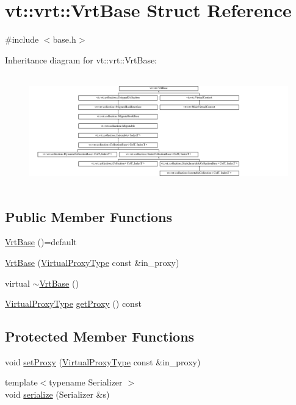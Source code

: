 \hypertarget{structvt_1_1vrt_1_1_vrt_base}{}\section{vt\+:\+:vrt\+:\+:Vrt\+Base Struct Reference}
\label{structvt_1_1vrt_1_1_vrt_base}


{\ttfamily \#include $<$base.\+h$>$}

Inheritance diagram for vt\+:\+:vrt\+:\+:Vrt\+Base\+:\begin{figure}[H]
\begin{center}
\leavevmode
\includegraphics[height=4.873803cm]{structvt_1_1vrt_1_1_vrt_base}
\end{center}
\end{figure}
\subsection*{Public Member Functions}
\begin{DoxyCompactItemize}
\item 
\hyperlink{structvt_1_1vrt_1_1_vrt_base_a5f98da4f22c55e58f5759eb84ac7cd06}{Vrt\+Base} ()=default
\item 
\hyperlink{structvt_1_1vrt_1_1_vrt_base_a7cc2b4f4ad3f2807e73b3d7a0a5b3676}{Vrt\+Base} (\hyperlink{namespacevt_a1b417dd5d684f045bb58a0ede70045ac}{Virtual\+Proxy\+Type} const \&in\+\_\+proxy)
\item 
virtual \hyperlink{structvt_1_1vrt_1_1_vrt_base_a16d15fcaabbf2e477315466dcaaa6f84}{$\sim$\+Vrt\+Base} ()
\item 
\hyperlink{namespacevt_a1b417dd5d684f045bb58a0ede70045ac}{Virtual\+Proxy\+Type} \hyperlink{structvt_1_1vrt_1_1_vrt_base_a30ea8cc8e915777f3106038c73cdb499}{get\+Proxy} () const
\end{DoxyCompactItemize}
\subsection*{Protected Member Functions}
\begin{DoxyCompactItemize}
\item 
void \hyperlink{structvt_1_1vrt_1_1_vrt_base_aa85b1aa3096a2adffe229927d76cebfd}{set\+Proxy} (\hyperlink{namespacevt_a1b417dd5d684f045bb58a0ede70045ac}{Virtual\+Proxy\+Type} const \&in\+\_\+proxy)
\item 
{\footnotesize template$<$typename Serializer $>$ }\\void \hyperlink{structvt_1_1vrt_1_1_vrt_base_acabd8e5dbd23894c036e870148ddba90}{serialize} (Serializer \&s)
\end{DoxyCompactItemize}

